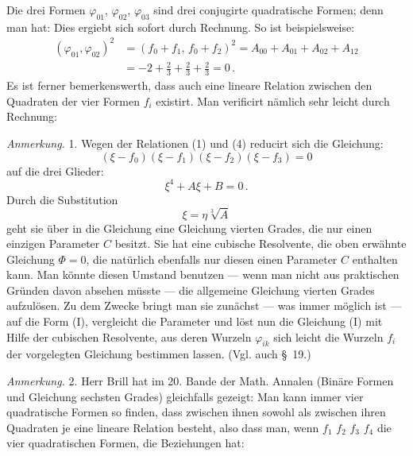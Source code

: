 Die drei Formen $\varphi_{01}$, $\varphi_{02}$, $\varphi_{03}$ sind drei conjugirte quadratische Formen; denn man hat:
Dies ergiebt sich sofort durch Rechnung. So ist beispielsweise:
\[
\begin{aligned}
(\varphi_{01},\varphi_{02})^2 &= (f_0+f_1,\,f_0+f_2)^2 = A_{00}+A_{01}+A_{02}+A_{12}\\
&= -2 + \frac{2}{3} + \frac{2}{3} + \frac{2}{3} = 0\,.
\end{aligned}
\]
Es ist ferner bemerkenswerth, dass auch eine lineare Relation zwischen den Quadraten der vier Formen $f_i$ existirt. Man verificirt nämlich sehr leicht durch Rechnung:

\textit{Anmerkung.} 1. Wegen der Relationen (1) und (4) reducirt sich die Gleichung:
\[
(\xi-f_0)(\xi-f_1)(\xi-f_2)(\xi-f_3)=0
\]
auf die drei Glieder:
\[
\xi^4+A\xi+B=0\,.
\]
Durch die Substitution
\[
\xi=\eta\sqrt[3]{A}
\]
geht sie über in die Gleichung
eine Gleichung vierten Grades, die nur einen einzigen Parameter $C$ besitzt. Sie hat eine cubische Resolvente, die oben erwähnte Gleichung $\Phi=0$, die natürlich ebenfalls nur diesen einen Parameter $C$ enthalten kann. Man könnte diesen Umstand benutzen — wenn man nicht aus praktischen Gründen davon absehen müsste — die allgemeine Gleichung vierten Grades aufzulösen. Zu dem Zwecke bringt man sie zunächst — was immer möglich ist — auf die Form (I), vergleicht die Parameter und löst nun die Gleichung (I) mit Hilfe der cubischen Resolvente, aus deren Wurzeln $\varphi_{ik}$ sich leicht die Wurzeln $f_i$ der vorgelegten Gleichung bestimmen lassen. (Vgl. auch \S~19.)

\textit{Anmerkung.} 2. Herr Brill hat im 20. Bande der Math. Annalen (Binäre Formen und Gleichung sechsten Grades) gleichfalls gezeigt: Man kann immer vier quadratische Formen so finden, dass zwischen ihnen sowohl als zwischen ihren Quadraten je eine lineare Relation besteht, also dass man, wenn $f_1$ $f_2$ $f_3$ $f_4$ die vier quadratischen Formen, die Beziehungen hat:



